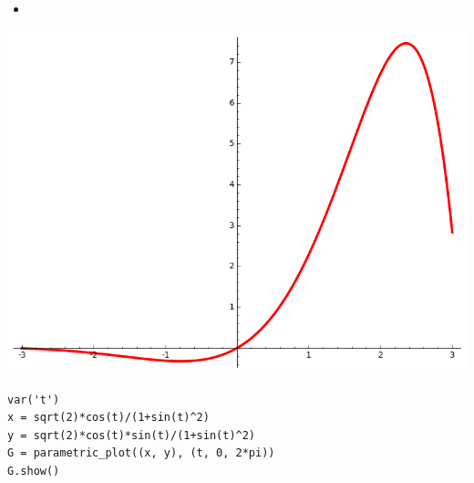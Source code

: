\begin{frame}[fragile]

\begin{itemize}
  \item {}
\end{itemize}

\begin{center}
 \includegraphics[scale=0.2]{figures/intro_courbes} \qquad
\end{center}

\pause\pause\pause
\begin{algo}
\begin{lstlisting}
var('t')
x = sqrt(2)*cos(t)/(1+sin(t)^2)
y = sqrt(2)*cos(t)*sin(t)/(1+sin(t)^2)
G = parametric_plot((x, y), (t, 0, 2*pi))
G.show()
\end{lstlisting}
\end{algo}


\end{frame}


